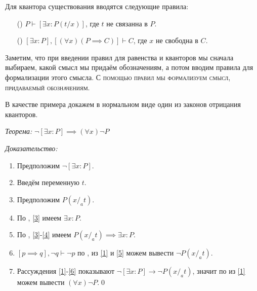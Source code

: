 Для квантора существования вводятся следующие правила:
\begin{enumerate}
	\item[(\Eii{})]$P\vdash [\exists x:P(t/x)]$, где $t$ не связанна в $P$.
	\item[(\Eee{})]$[\exists x:P],[(\forall x)(P\implies C)]\vdash C$,
	где $x$ не свободна в $C$.
\end{enumerate}

Заметим, что при введении правил для равенства и кванторов мы
сначала выбираем, какой смысл мы придаём обозначениям, а потом вводим
правила для формализации этого смысла.
\textsc{С помощью правил мы формализуем смысл, придаваемый обозначениям.}

В качестве примера докажем в нормальном виде один из законов отрицания кванторов.

{\it Теорема:} $\lnot [\exists x:P]\implies  (\forall x)\lnot P$

{\it Доказательство:}
\begin{enumerate}[label=(\arabic*)]
	\item{}\label{1}Предположим $\lnot [\exists x:P]$.
	\item{}\label{2}Введём переменную $t$.
	\item{}\label{3}Предположим $P(x/_{a}t)$.
	\item{}\label{4}По \Eii{}, \ref{3} имеем $\exists x:P$.
	\item{}\label{5}По \implic{}, \ref{3}-\ref{4} имеем
	$P(x/_{a}t)\implies \exists x:P$.
	\item{}\label{6}${[p\implies q],\lnot q\vdash \lnot p}$ по \taut{}, из
	\ref{1} и \ref{5} можем вывести $\lnot P(x/_{a}t)$.
	\item{}\label{7}Рассуждения \ref{1}-\ref{6} показывают
	$\lnot[\exists x:P]\to\lnot P(x/_{a}t)$, значит по \Aii{} из \ref{1} можем
	вывести $(\forall x)\lnot P$.\qed
\end{enumerate}


